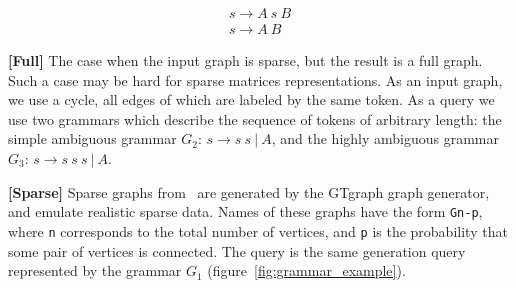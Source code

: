         \[
         \begin{array}{l}
           s \rightarrow A \ s \ B \\
           s \rightarrow A \ B
         \end{array}
         \]


\textbf{[Full]} The case when the input graph is sparse, but the result is a full graph.
Such a case may be hard for sparse matrices representations.
As an input graph, we use a cycle, all edges of which are labeled by the same token.
As a query we use two grammars which describe the sequence of tokens of arbitrary length: the simple ambiguous grammar $G_2$: $s \rightarrow  s \ s \ | \ A$,  and the highly ambiguous grammar $G_3$: $s \rightarrow s \ s \ s \ | \ A$.

\textbf{[Sparse]} Sparse graphs from~\cite{fan2018scaling} are generated by the GTgraph graph generator, and emulate realistic sparse data.
Names of these graphs have the form \texttt{Gn-p}, where \texttt{n} corresponds to the total number of vertices, and \texttt{p} is the probability that some pair of vertices is connected.
The query is the same generation query represented by the grammar $G_1$ (figure~\ref{fig:grammar_example}).
